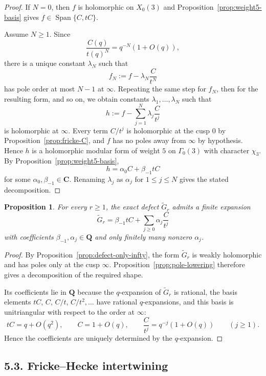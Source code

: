 \documentclass[11pt]{amsart}
\newtheorem{proposition}[theorem]{Proposition}
\theoremstyle{remark}
\DeclareMathOperator{\Span}{Span}
\newcommand{\Q}{\mathbf{Q}}
\newcommand{\C}{\mathbf{C}}
\begin{document}
\begin{proof}
If $N=0$, then $f$ is holomorphic on $X_0(3)$ and Proposition~\ref{prop:weight5-basis} gives
$f\in\Span\{C,tC\}$.

Assume $N\ge1$. Since
\[
\frac{C(q)}{t(q)^N}=q^{-N}(1+O(q)),
\]
there is a unique constant $\lambda_N$ such that
\[
f_N:=f-\lambda_N\frac{C}{t^N}
\]
has pole order at most $N-1$ at $\infty$. Repeating the same step for $f_N$, then for the resulting form,
and so on, we obtain constants $\lambda_1,\dots,\lambda_N$ such that
\[
h:=f-\sum_{j=1}^{N}\lambda_j\frac{C}{t^j}
\]
is holomorphic at $\infty$. Every term $C/t^j$ is holomorphic at the cusp $0$ by
Proposition~\ref{prop:fricke-C}, and $f$ has no poles away from $\infty$ by hypothesis. Hence $h$ is a
holomorphic modular form of weight $5$ on $\Gamma_0(3)$ with character $\chi_3$. By
Proposition~\ref{prop:weight5-basis},
\[
h=\alpha_0 C+\beta_{-1}tC
\]
for some $\alpha_0,\beta_{-1}\in\C$. Renaming $\lambda_j$ as $\alpha_j$ for $1\le j\le N$ gives the stated
decomposition.
\end{proof}

\begin{proposition}\label{prop:rr-decomposition}
For every $r\ge1$, the exact defect $\widetilde G_r$ admits a finite expansion
\[
\widetilde G_r=\beta_{-1}tC+\sum_{j\ge0}\alpha_j\frac{C}{t^j}
\]
with coefficients $\beta_{-1},\alpha_j\in\Q$ and only finitely many nonzero $\alpha_j$.
\end{proposition}

\begin{proof}
By Proposition~\ref{prop:defect-only-infty}, the form $\widetilde G_r$ is weakly holomorphic and has poles
only at the cusp $\infty$. Proposition~\ref{prop:pole-lowering} therefore gives a decomposition of the
required shape.

Its coefficients lie in $\Q$ because the $q$-expansion of $\widetilde G_r$ is rational, the basis elements
$tC$, $C$, $C/t$, $C/t^2,\dots$ have rational $q$-expansions, and this basis is unitriangular with respect
to the order at $\infty$:
\[
tC=q+O(q^2),\qquad C=1+O(q),\qquad \frac{C}{t^j}=q^{-j}(1+O(q))
\qquad (j\ge1).
\]
Hence the coefficients are uniquely determined by the $q$-expansion.
\end{proof}

\subsection*{5.3. Fricke--Hecke intertwining}
\end{document}

